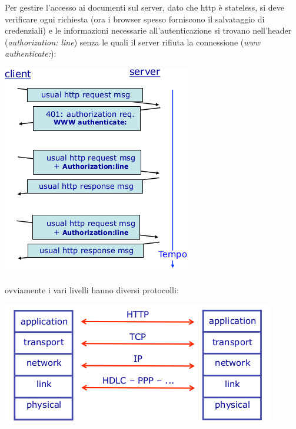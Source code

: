 \documentclass[a4paper,12pt, oneside]{book}
\begin{document}
Per gestire l'accesso ai documenti sul server, dato che http è stateless, si deve verificare ogni richiesta (ora i browser spesso forniscono il salvataggio di credenziali) e le informazioni necessarie all'autenticazione si trovano nell'header (\textit{authorization: line}) senza le quali il server rifiuta la connessione (\textit{www authenticate:}):
\begin{center}
	\includegraphics[scale=0.7]{img/http6.png}
\end{center}
ovviamente i vari livelli hanno diversi protocolli:
\begin{center}
	\includegraphics[scale=0.7]{img/http7.png}
\end{center}
\end{document}
